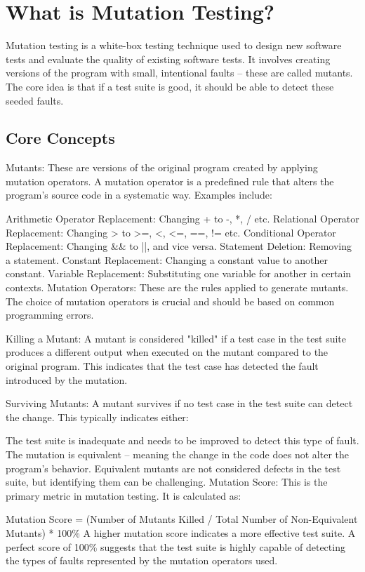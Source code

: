 \documentclass[sigplan, nonacm]{acmart}
\begin{document}
\section{What is Mutation Testing?}

Mutation testing is a white-box testing technique used to design new software tests and evaluate
the quality of existing software tests. It involves creating versions of the program with small,
intentional faults – these are called mutants. The core idea is that if a test suite is good, it
should be able to detect these seeded faults.

\subsection{Core Concepts}

Mutants: These are versions of the original program created by applying mutation operators. A
mutation operator is a predefined rule that alters the program's source code in a systematic way.
Examples include:

Arithmetic Operator Replacement: Changing + to -, *, / etc.
Relational Operator Replacement: Changing > to >=, <, <=, ==, != etc.
Conditional Operator Replacement: Changing \&\& to ||, and vice versa.
Statement Deletion: Removing a statement.
Constant Replacement: Changing a constant value to another constant.
Variable Replacement: Substituting one variable for another in certain contexts.
Mutation Operators: These are the rules applied to generate mutants. The choice of mutation
operators is crucial and should be based on common programming errors.

Killing a Mutant: A mutant is considered "killed" if a test case in the test suite produces a
different output when executed on the mutant compared to the original program. This indicates that
the test case has detected the fault introduced by the mutation.

Surviving Mutants: A mutant survives if no test case in the test suite can detect the change. This
typically indicates either:

The test suite is inadequate and needs to be improved to detect this type of fault.
The mutation is equivalent – meaning the change in the code does not alter the program's behavior.
Equivalent mutants are not considered defects in the test suite, but identifying them can be
challenging.
Mutation Score: This is the primary metric in mutation testing. It is calculated as:

Mutation Score = (Number of Mutants Killed / Total Number of Non-Equivalent Mutants) * 100\%
A higher mutation score indicates a more effective test suite. A perfect score of 100\% suggests
that the test suite is highly capable of detecting the types of faults represented by the mutation
operators used.
\end{document}
